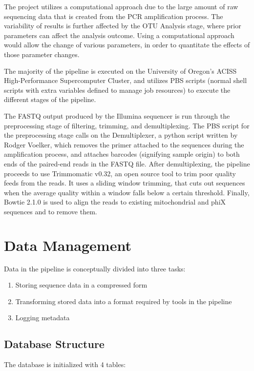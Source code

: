 \documentclass[12pt]{article}
\begin{document}
	The project utilizes a computational approach due to the large amount of raw sequencing data that is created from the PCR amplification process. The variability of results is further affected by the OTU Analysis stage, where prior parameters can affect the analysis outcome. Using a computational approach would allow the change of various parameters, in order to quantitate the effects of those parameter changes.

	The majority of the pipeline is executed on the University of Oregon’s ACISS High-Performance Supercomputer Cluster, and utilizes PBS scripts (normal shell scripts with extra variables defined to manage job resources) to execute the different stages of the pipeline.

	The FASTQ output produced by the Illumina sequencer is run through the preprocessing stage of filtering, trimming, and demultiplexing. The PBS script for the preprocessing stage calls on the Demultiplexer, a python script written by Rodger Voelker, which removes the primer attached to the sequences during the amplification process, and attaches barcodes (signifying sample origin) to both ends of the paired-end reads in the FASTQ file. After demultiplexing, the pipeline proceeds to use Trimmomatic v0.32, an open source tool to trim poor quality feeds from the reads. It uses a sliding window trimming, that cuts out sequences when the average quality within a window falls below a certain threshold. Finally, Bowtie 2.1.0 is used to align the reads to existing mitochondrial and phiX sequences and to remove them.
	
	\section{Data Management} %
	\label{sec:data_management}
	Data in the pipeline is conceptually divided into three tasks:
	
	\begin{enumerate}
		\item Storing sequence data in a compressed form
		\item Transforming stored data into a format required by tools in the pipeline
		\item Logging metadata
	\end{enumerate}

	\subsection{Database Structure} %
	\label{sub:database_structure}
	The database is initialized with 4 tables:
\end{document}
